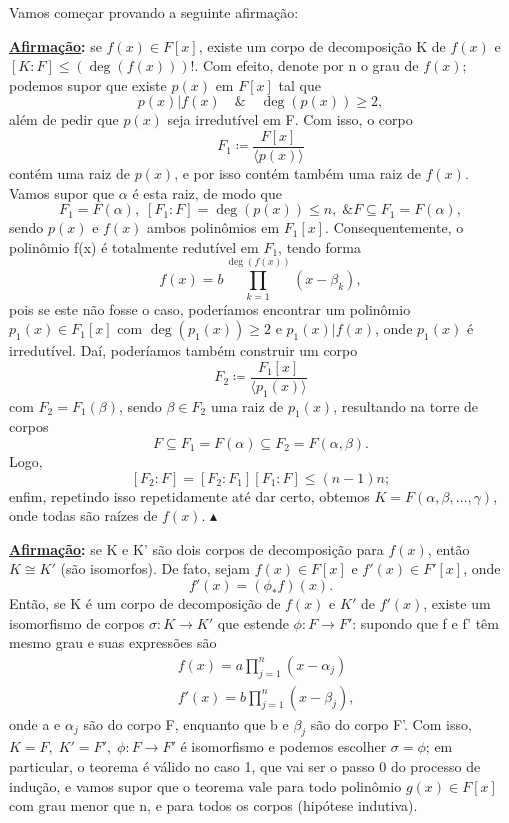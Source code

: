 \documentclass[../algebraIII_notes.tex]{subfiles}
\begin{document}
\begin{proof*}
	Vamos começar provando a seguinte afirmação:

	\textbf{\underline{Afirmação}:} se \(f(x)\in F[x]\), existe um corpo de decomposição K de \(f(x)\) e \([K:F]\leq (\deg{(f(x))})!\). Com efeito, denote por n o grau de \(f(x)\); podemos supor que existe \(p(x)\) em \(F[x]\) tal que
	\[
		p(x)|f(x)\quad\&\quad \deg{(p(x))}\geq 2,
	\]
	além de pedir que \(p(x)\) seja irredutível em F. Com isso, o corpo
	\[
		F_{1}\coloneqq \frac{F[x]}{\langle p(x) \rangle}
	\]
	contém uma raiz de \(p(x)\), e por isso contém também uma raiz de \(f(x)\). Vamos supor que \(\alpha \) é esta raiz, de modo que
	\[
		F_1=F(\alpha ),\; [F_1:F]=\deg{(p(x))}\leq n,\; \& F\subseteq F_1=F(\alpha ),
	\]
	sendo \(p(x)\) e \(f(x)\) ambos polinômios em \(F_1[x].\) Consequentemente, o polinômio f(x) é totalmente redutível em \(F_1\), tendo forma
	\[
		f(x)=b \prod\limits_{k=1}^{\deg{(f(x))}}(x-\beta_{k}),
	\]
	pois se este não fosse o caso, poderíamos encontrar um polinômio \(p_1(x)\in F_1[x]\) com \(\deg{(p_{1}(x))}\geq 2\) e \(p_{1}(x)| f(x)\), onde \(p_1(x)\) é irredutível. Daí, poderíamos também construir um corpo
	\[
		F_{2}\coloneqq \frac{F_{1}[x]}{\langle p_{1}(x) \rangle}
	\]
	com \(F_{2}=F_{1}(\beta )\), sendo \(\beta \in F_{2}\) uma raiz de \(p_{1}(x)\), resultando na torre de corpos
	\[
		F\subseteq F_{1}=F(\alpha )\subseteq F_{2}=F(\alpha , \beta ).
	\]
	Logo,
	\[
		[F_{2}:F]=[F_{2}:F_{1}][F_{1}:F]\leq (n-1)n;
	\]
	enfim, repetindo isso repetidamente até dar certo, obtemos \(K= F(\alpha , \beta , \dotsc , \gamma )\), onde todas são raízes de \(f(x)\). \(\blacktriangle\)

	\textbf{\underline{Afirmação}:} se K e K' são dois corpos de decomposição para \(f(x)\), então \(K\cong K'\) (são isomorfos). De fato, sejam \(f(x)\in F[x]\) e \(f'(x)\in F'[x]\), onde
	\[
		f'(x)=(\phi_{*}f)(x).
	\]
	Então, se K é um corpo de decomposição de \(f(x)\) e \(K'\) de \(f'(x)\), existe um isomorfismo de corpos \(\sigma :K\rightarrow K'\) que estende \(\phi:F\rightarrow F'\): supondo que f e f' têm mesmo grau e suas expressões são
	\begin{align*}
		 & f(x)=a \prod\limits_{j=1}^{n}(x-\alpha _{j}) \\
		 & f'(x)=b \prod\limits_{j=1}^{n}(x-\beta_{j}),
	\end{align*}
	onde a e \(\alpha_{j}\) são do corpo F, enquanto que b e \(\beta_{j}\) são do corpo F'. Com isso, \(K=F,\; K'=F',\; \phi:F\rightarrow F'\) é isomorfismo e podemos escolher \(\sigma =\phi \); em particular, o teorema é válido no caso 1, que vai ser o passo 0 do processo de indução, e vamos supor que o teorema vale para todo polinômio \(g(x)\in F[x]\) com grau menor que n, e para todos os corpos (hipótese indutiva).


\end{proof*}
\end{document}
